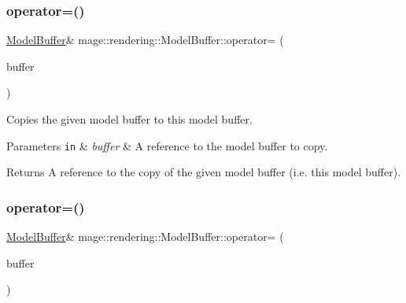\subsubsection{\texorpdfstring{operator=()}{operator=()}\hspace{0.1cm}{\footnotesize\ttfamily [1/2]}}
{\footnotesize\ttfamily \mbox{\hyperlink{structmage_1_1rendering_1_1_model_buffer}{Model\+Buffer}}\& mage\+::rendering\+::\+Model\+Buffer\+::operator= (\begin{DoxyParamCaption}\item[{const \mbox{\hyperlink{structmage_1_1rendering_1_1_model_buffer}{Model\+Buffer}} \&}]{buffer }\end{DoxyParamCaption})\hspace{0.3cm}{\ttfamily [default]}}

Copies the given model buffer to this model buffer.


\begin{DoxyParams}[1]{Parameters}
\mbox{\tt in}  & {\em buffer} & A reference to the model buffer to copy. \\
\hline
\end{DoxyParams}
\begin{DoxyReturn}{Returns}
A reference to the copy of the given model buffer (i.\+e. this model buffer). 
\end{DoxyReturn}
\mbox{\label{structmage_1_1rendering_1_1_model_buffer_a083377a5af4c7b14c2db8659824789ff}} 
\subsubsection{\texorpdfstring{operator=()}{operator=()}\hspace{0.1cm}{\footnotesize\ttfamily [2/2]}}
{\footnotesize\ttfamily \mbox{\hyperlink{structmage_1_1rendering_1_1_model_buffer}{Model\+Buffer}}\& mage\+::rendering\+::\+Model\+Buffer\+::operator= (\begin{DoxyParamCaption}\item[{\mbox{\hyperlink{structmage_1_1rendering_1_1_model_buffer}{Model\+Buffer}} \&\&}]{buffer }\end{DoxyParamCaption})\hspace{0.3cm}{\ttfamily [default]}}

